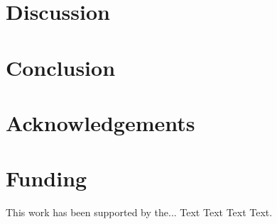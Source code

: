 \documentclass{bioinfo}
\begin{document}
\section{Discussion}



%
%



\section{Conclusion}


\section*{Acknowledgements}


\section*{Funding}

This work has been supported by the... Text Text  Text Text.\vspace*{-12pt}

%
%
%
%

%
%
%




\end{document}
